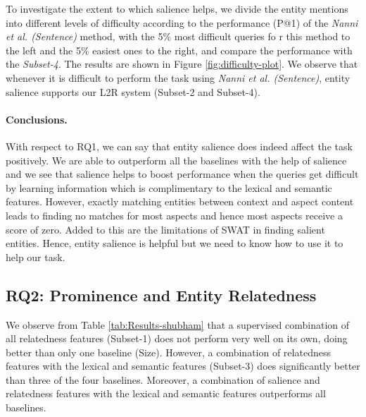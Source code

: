 To investigate the extent to which salience helps, we divide the entity mentions  into different levels of difficulty according to the performance (P@1) of the \textit{Nanni et al. (Sentence)} method, with the 5\% most difficult queries fo
r this method to the left and the 5\% easiest ones to the right, and compare the performance with the \textit{Subset-4}. The results are shown in Figure \ref{fig:difficulty-plot}. We observe that whenever it is difficult to perform the task using \textit{Nanni et al. (Sentence)}, entity salience supports our L2R system (Subset-2 and Subset-4).


\paragraph{\textbf{Conclusions.}}
With respect to RQ1, we can say that entity salience does indeed affect the task positively. We are able to outperform all the baselines with the help of salience and we see that salience helps to boost performance when the queries get difficult by learning information which is complimentary to the lexical and semantic features. However, exactly matching entities between context and aspect content leads to finding no matches for most aspects and hence most aspects receive a score of zero. Added to this are the limitations of SWAT in finding salient entities. Hence, entity salience is helpful but we need to know how to use it to help our task.


\subsection{RQ2: Prominence and Entity Relatedness}
\label{subsubsec:Prominence and Entity Relatedness}

We observe from Table \ref{tab:Results-shubham} that a supervised combination of all relatedness features (Subset-1) does not perform very well on its own, doing better than only one baseline (Size). However, a combination of relatedness features with the lexical and semantic features (Subset-3) does significantly better than three of the four baselines. Moreover, a combination of salience and relatedness features with the lexical and semantic features outperforms all baselines. 

